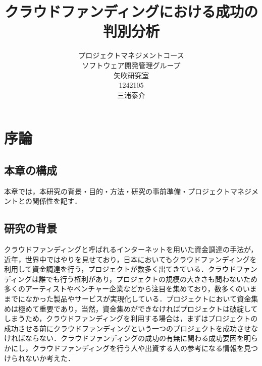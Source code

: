 \title{クラウドファンディングにおける成功の判別分析}
\author{プロジェクトマネジメントコース\\
ソフトウェア開発管理グループ\\
矢吹研究室\\
1242105\\
三浦泰介}
\date{}

\maketitle




\tableofcontents%

\chapter{序論}

\section{本章の構成}
本章では，本研究の背景・目的・方法・研究の事前準備・プロジェクトマネジメントとの関係性を記す．
\section{研究の背景}
クラウドファンディング\cite{wiki}と呼ばれるインターネットを用いた資金調達の手法が，近年，世界中ではやりを見せており，日本においてもクラウドファンディングを利用して資金調達を行う，プロジェクトが数多く出てきている\cite{kaihatu}．クラウドファンディングは誰でも行う権利があり，プロジェクトの規模の大きさも問わないため多くのアーティストやベンチャー企業などから注目を集めており，数多くのいままでになかった製品やサービスが実現化している\cite{kaihatu}．プロジェクトにおいて資金集めは極めて重要であり，当然，資金集めができなければプロジェクトは破綻してしまうため，クラウドファンディングを利用する場合は，まずはプロジェクトの成功させる前にクラウドファンディングという一つのプロジェクトを成功させなければならない．クラウドファンディングの成功の有無に関わる成功要因を明らかにし，クラウドファンディングを行う人や出資する人の参考になる情報を見つけられないか考えた．

